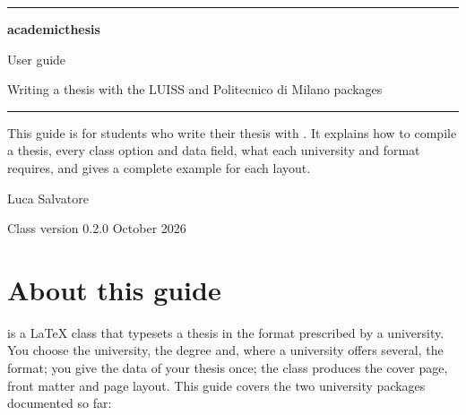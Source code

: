 \documentclass[11pt,a4paper]{article}
\begin{document}
\hypersetup{pageanchor=false}
\begin{titlepage}
  \thispagestyle{empty}
  \vspace*{3cm}
  {\color{docaccent}\rule{\linewidth}{1.2pt}}\par\vspace{14pt}
  {\fontsize{30}{36}\selectfont\bfseries\color{docaccent} academicthesis\par}
  \vspace{10pt}
  {\LARGE User guide\par}
  \vspace{6pt}
  {\Large Writing a thesis with the LUISS and Politecnico di Milano packages\par}
  \vspace{14pt}
  {\color{docaccent}\rule{\linewidth}{1.2pt}}\par
  \vspace{1.5cm}
  \begin{minipage}{0.8\linewidth}
    This guide is for students who write their thesis with
    . It explains how to compile a thesis, every class
    option and data field, what each university and format requires, and
    gives a complete example for each layout.
  \end{minipage}
  \vfill
  {\large Luca Salvatore\par}
  {\color{docgrey} Class version 0.2.0 \quad\textbullet\quad October 2026\par}
\end{titlepage}
\hypersetup{pageanchor=true}

{\setlength{\parskip}{0pt}\tableofcontents}
\clearpage

\section{About this guide}

 is a \LaTeX{} class that typesets a thesis in the
format prescribed by a university. You choose the university, the degree
and, where a university offers several, the format; you give the data of
your thesis once; the class produces the cover page, front matter and page
layout. This guide covers the two university packages documented so far:
\end{document}
